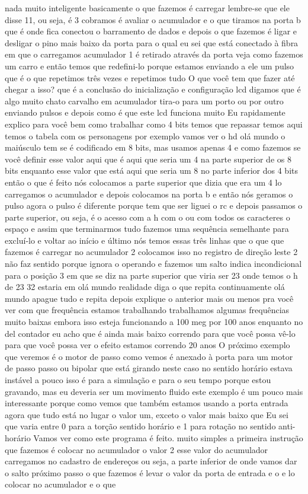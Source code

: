 \documentclass[oneside,11pt]{memoir} %
\begin{document}
nada muito inteligente  basicamente o que fazemos é carregar  lembre-se que ele disse 11, ou seja, é 3  cobramos é avaliar o acumulador e o que  tiramos na porta b que é onde fica  conectou o barramento de dados e depois  o que fazemos é ligar e desligar  o pino mais baixo da porta para o qual eu sei que  está conectado à fibra em que o carregamos  acumulador 1 é retirado através da porta  veja como fazemos um carro e então  temos que redefini-lo porque  estamos enviando a ele um pulso que é o que  repetimos três vezes e repetimos tudo  O que você tem que fazer até chegar a isso?  que é a conclusão do  inicialização e configuração  lcd digamos que é algo muito chato  carvalho em acumulador tira-o para um  porto ou por outro enviando pulsos e  depois como é que este lcd funciona muito  Eu rapidamente explico para você  bem como trabalhar como 4 bits  temos que repassar temos aqui temos o  tabela com os personagens por exemplo  vamos ver o hd olá mundo o  maiúsculo tem se é codificado em 8  bits, mas usamos apenas 4 e como fazemos  se você definir esse valor aqui que é aqui que  seria um 4 na parte superior de  os 8 bits enquanto esse valor que  está aqui que seria um 8 no  parte inferior dos 4 bits  então o que é feito nós colocamos  a parte superior que dizia que era um 4 lo  carregamos o acumulador e depois  colocamos na porta b e então  nós geramos o pulso agora o pulso é  diferente porque tem que ser  liguei o rc e depois passamos o  parte superior, ou seja, é o acesso com a  h com o ou com todos os caracteres o  espaço e assim que terminarmos tudo  fazemos uma sequência semelhante para  excluí-lo e voltar ao início e último  nós temos essas três linhas que o que  que fazemos é carregar no acumulador 2  colocamos isso no registro de  direção leste 2 não faz sentido  porque ignora o operando e fazemos um  salto indica incondicional para o  posição 3 em que se diz  na parte superior que viria  ser 23  onde temos o h de 23 32 estaria em  olá mundo realidade diga o que  repita continuamente olá mundo  apague tudo e repita depois explique  o anterior mais ou menos pra você ver  com que frequência estamos trabalhando  trabalhamos algumas frequências muito baixas  embora isso esteja funcionando a 100 meg por  100 anos enquanto no del  contador eu acho que é ainda mais baixo  correndo para que você possa vê-lo  para que você possa ver o efeito  estamos correndo 20 anos  O próximo exemplo que veremos é  o motor de passo como vemos é  anexado à porta para um motor de passo  passo ou bipolar que está girando neste  caso no sentido horário estava instável a  pouco isso é para a simulação e para o seu  tempo porque estou gravando, mas eu deveria  ser um movimento fluido este exemplo é  um pouco mais interessante porque como  vemos que também estamos usando a porta  entrada agora que tudo está no lugar  o valor um, exceto o valor mais baixo que  Eu sei que varia entre 0 para a torção  sentido horário e 1 para rotação no sentido anti-horário  Vamos ver como este programa é feito.  muito simples a primeira instrução que  fazemos é colocar no acumulador o  valor 2 esse valor do acumulador  carregamos no cadastro de endereços  ou seja, a parte inferior de onde vamos  dar o salto  próximo passo o que fazemos é levar  o valor da porta de entrada e o e lo  colocar no acumulador  e o que 
\end{document}
